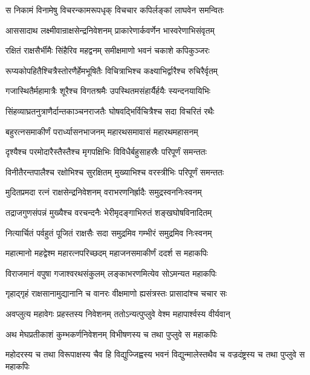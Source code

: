 
\twolineshloka
{स निकामं विनामेषु विचरन्कामरूपधृक्}
{विचचार कपिर्लङ्कां लाघवेन समन्वितः} %

\twolineshloka
{आससादाथ लक्ष्मीवान्राक्षसेन्द्रनिवेशनम्}
{प्राकारेणार्कवर्णेन भास्वरेणाभिसंवृतम्} %

\twolineshloka
{रक्षितं राक्षसैर्भीमैः सिंहैरिव महद्वनम्}
{समीक्षमाणो भवनं चकाशे कपिकुञ्जरः} %

\twolineshloka
{रूप्यकोपहितैश्चित्रैस्तोरणैर्हेमभूषितैः}
{विचित्राभिश्च कक्ष्याभिर्द्वारैश्च रुचिरैर्वृतम्} %

\twolineshloka
{गजास्थितैर्महामात्रैः शूरैश्च विगतश्रमैः}
{उपस्थितमसंहार्यैर्हयैः स्यन्दनयायिभिः} %

\twolineshloka
{सिंहव्याघ्रतनुत्राणैर्दान्तकाञ्चनराजतैः}
{घोषवद्भिर्विचित्रैश्च सदा विचरितं रथैः} %

\twolineshloka
{बहुरत्नसमाकीर्णं परार्ध्यासनभाजनम्}
{महारथसमावासं महारथमहासनम्} %

\twolineshloka
{दृश्यैश्च परमोदारैस्तैस्तैश्च मृगपक्षिभिः}
{विविधैर्बहुसाहस्रैः परिपूर्णं समन्ततः} %

\twolineshloka
{विनीतैरन्तपालैश्च रक्षोभिश्च सुरक्षितम्}
{मुख्याभिश्च वरस्त्रीभिः परिपूर्णं समन्ततः} %

\twolineshloka
{मुदितप्रमदा रत्नं राक्षसेन्द्रनिवेशनम्}
{वराभरणनिर्ह्रादैः समुद्रस्वननिःस्वनम्} %

\twolineshloka
{तद्राजगुणसंपन्नं मुख्यैश्च वरचन्दनैः}
{भेरीमृदङ्गाभिरुतं शङ्खघोषविनादितम्} %

\twolineshloka
{नित्यार्चितं पर्वहुतं पूजितं राक्षसैः सदा}
{समुद्रमिव गम्भीरं समुद्रमिव निःस्वनम्} %

\twolineshloka
{महात्मानो महद्वेश्म महारत्नपरिच्छदम्}
{महाजनसमाकीर्णं ददर्श स महाकपिः} %

\twolineshloka
{विराजमानं वपुषा गजाश्वरथसंकुलम्}
{लङ्काभरणमित्येव सोऽमन्यत महाकपिः} %

\twolineshloka
{गृहाद्गृहं राक्षसानामुद्यानानि च वानरः}
{वीक्षमाणो ह्यसंत्रस्तः प्रासादांश्च चचार सः} %

\twolineshloka
{अवप्लुत्य महावेगः प्रहस्तस्य निवेशनम्}
{ततोऽन्यत्पुप्लुवे वेश्म महापार्श्वस्य वीर्यवान्} %

\twolineshloka
{अथ मेघप्रतीकाशं कुम्भकर्णनिवेशनम्}
{विभीषणस्य च तथा पुप्लुवे स महाकपिः} %

\threelineshloka
{महोदरस्य च तथा विरूपाक्षस्य चैव हि}
{विद्युज्जिह्वस्य भवनं विद्युन्मालेस्तथैव च}
{वज्रदंष्ट्रस्य च तथा पुप्लुवे स महाकपिः} %

